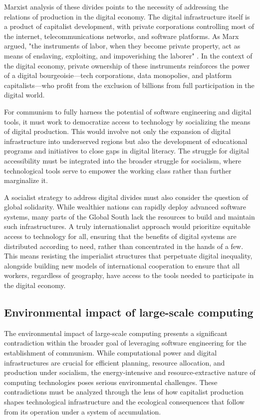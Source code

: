 \begin{refsection}
Marxist analysis of these divides points to the necessity of addressing the relations of production in the digital economy. The digital infrastructure itself is a product of capitalist development, with private corporations controlling most of the internet, telecommunications networks, and software platforms. As Marx argued, "the instruments of labor, when they become private property, act as means of enslaving, exploiting, and impoverishing the laborer" \cite[pp.~416]{marx_capital_vol1}. In the context of the digital economy, private ownership of these instruments reinforces the power of a digital bourgeoisie—tech corporations, data monopolies, and platform capitalists—who profit from the exclusion of billions from full participation in the digital world. 

For communism to fully harness the potential of software engineering and digital tools, it must work to democratize access to technology by socializing the means of digital production. This would involve not only the expansion of digital infrastructure into underserved regions but also the development of educational programs and initiatives to close gaps in digital literacy. The struggle for digital accessibility must be integrated into the broader struggle for socialism, where technological tools serve to empower the working class rather than further marginalize it.

A socialist strategy to address digital divides must also consider the question of global solidarity. While wealthier nations can rapidly deploy advanced software systems, many parts of the Global South lack the resources to build and maintain such infrastructures. A truly internationalist approach would prioritize equitable access to technology for all, ensuring that the benefits of digital systems are distributed according to need, rather than concentrated in the hands of a few. This means resisting the imperialist structures that perpetuate digital inequality, alongside building new models of international cooperation to ensure that all workers, regardless of geography, have access to the tools needed to participate in the digital economy.

\subsection{Environmental impact of large-scale computing}

The environmental impact of large-scale computing presents a significant contradiction within the broader goal of leveraging software engineering for the establishment of communism. While computational power and digital infrastructures are crucial for efficient planning, resource allocation, and production under socialism, the energy-intensive and resource-extractive nature of computing technologies poses serious environmental challenges. These contradictions must be analyzed through the lens of how capitalist production shapes technological infrastructure and the ecological consequences that follow from its operation under a system of accumulation.


\end{refsection}
